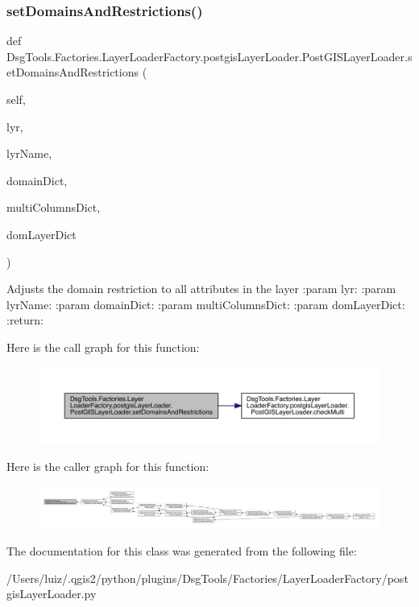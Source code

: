 \subsubsection{\texorpdfstring{set\+Domains\+And\+Restrictions()}{setDomainsAndRestrictions()}}
{\footnotesize\ttfamily def Dsg\+Tools.\+Factories.\+Layer\+Loader\+Factory.\+postgis\+Layer\+Loader.\+Post\+G\+I\+S\+Layer\+Loader.\+set\+Domains\+And\+Restrictions (\begin{DoxyParamCaption}\item[{}]{self,  }\item[{}]{lyr,  }\item[{}]{lyr\+Name,  }\item[{}]{domain\+Dict,  }\item[{}]{multi\+Columns\+Dict,  }\item[{}]{dom\+Layer\+Dict }\end{DoxyParamCaption})}

\begin{DoxyVerb}Adjusts the domain restriction to all attributes in the layer
:param lyr:
:param lyrName:
:param domainDict:
:param multiColumnsDict:
:param domLayerDict:
:return:
\end{DoxyVerb}
 Here is the call graph for this function\+:
\nopagebreak
\begin{figure}[H]
\begin{center}
\leavevmode
\includegraphics[width=350pt]{class_dsg_tools_1_1_factories_1_1_layer_loader_factory_1_1postgis_layer_loader_1_1_post_g_i_s_layer_loader_a240348693e7c7e44ec9de1ac924ee99a_cgraph}
\end{center}
\end{figure}
Here is the caller graph for this function\+:
\nopagebreak
\begin{figure}[H]
\begin{center}
\leavevmode
\includegraphics[width=350pt]{class_dsg_tools_1_1_factories_1_1_layer_loader_factory_1_1postgis_layer_loader_1_1_post_g_i_s_layer_loader_a240348693e7c7e44ec9de1ac924ee99a_icgraph}
\end{center}
\end{figure}


The documentation for this class was generated from the following file\+:\begin{DoxyCompactItemize}
\item 
/\+Users/luiz/.\+qgis2/python/plugins/\+Dsg\+Tools/\+Factories/\+Layer\+Loader\+Factory/postgis\+Layer\+Loader.\+py\end{DoxyCompactItemize}
